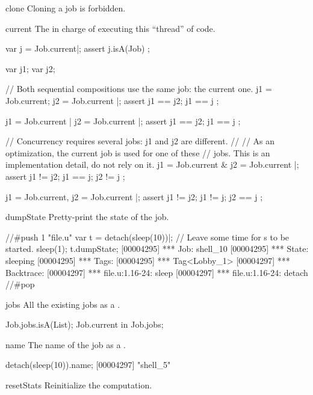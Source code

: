 \begin{urbiscriptapi}
\item[clone]
  Cloning a job is forbidden.

\item[current]%
  The  in charge of executing this ``thread'' of code.
\begin{urbiscript}
var j = Job.current|;
assert { j.isA(Job) };

var j1; var j2;

// Both sequential compositions use the same job: the current one.
{ j1 = Job.current; j2 = Job.current }|;
assert { j1 == j2; j1 == j };

{ j1 = Job.current | j2 = Job.current }|;
assert { j1 == j2; j1 == j };

// Concurrency requires several jobs: j1 and j2 are different.
//
// As an optimization, the current job is used for one of these
// jobs.  This is an implementation detail, do not rely on it.
{ j1 = Job.current & j2 = Job.current }|;
assert { j1 != j2; j1 == j; j2 != j };

{ j1 = Job.current, j2 = Job.current }|;
assert { j1 != j2; j1 != j; j2 == j };
\end{urbiscript}

\item[dumpState]
  Pretty-print the state of the job.

\begin{urbiscript}
//#push 1 "file.u"
var t = detach(sleep(10))|;
// Leave some time for s to be started.
sleep(1);
t.dumpState;
[00004295] *** Job: shell_10
[00004295] ***   State: sleeping
[00004295] ***   Tags:
[00004295] ***     Tag<Lobby_1>
[00004297] ***   Backtrace:
[00004297] ***     file.u:1.16-24: sleep
[00004297] ***     file.u:1.16-24: detach
//#pop
\end{urbiscript}

\item[jobs]%
  All the existing jobs as a .
\begin{urbiassert}
Job.jobs.isA(List);
Job.current in Job.jobs;
\end{urbiassert}

\item[name] The name of the job as a .
\begin{urbiscript}
detach(sleep(10)).name;
[00004297] "shell_5"
\end{urbiscript}

\item[resetStats]%
  Reinitialize the  computation.


\end{urbiscriptapi}
